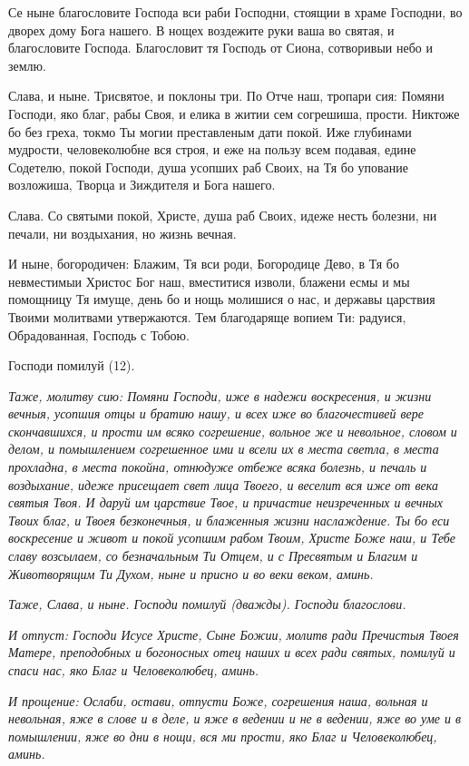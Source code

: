 Се ныне благословите Господа вси раби Господни, стоящии в храме Господни, во дворех дому Бога нашего. В нощех воздежите руки ваша во святая, и благословите Господа. Благословит тя Господь от Сиона, сотворивыи небо и землю.


Слава, и ныне. Трисвятое, и поклоны три. По Отче наш, тропари сия: Помяни Господи, яко благ, рабы Своя, и елика в житии сем согрешиша, прости. Никтоже бо без греха, токмо Ты могии преставленым дати покой. Иже глубинами мудрости, человеколюбне вся строя, и еже на пользу всем подавая, едине Содетелю, покой Господи, душа усопших раб Своих, на Тя бо упование возложиша, Творца и Зиждителя и Бога нашего.


Слава. Со святыми покой, Христе, душа раб Своих, идеже несть болезни, ни печали, ни воздыхания, но жизнь вечная.


И ныне, богородичен: Блажим, Тя вси роди, Богородице Дево, в Тя бо невместимыи Христос Бог наш, вместитися изволи, блажени есмы и мы помощницу Тя имуще, день бо и нощь молишися о нас, и державы царствия Твоими молитвами утвержаются. Тем благодаряще вопием Ти: радуися, Обрадованная, Господь с Тобою.


Господи помилуй (12).


\itshape Таже, молитву сию:\normalfont{} Помяни Господи, иже в надежи воскресения, и жизни вечныя, усопшия отцы и братию нашу, и всех иже во благочестивей вере скончавшихся, и прости им всяко согрешение, вольное же и невольное, словом и делом, и помышлением согрешенное ими и всели их в места светла, в места прохладна, в места покойна, отнюдуже отбеже всяка болезнь, и печаль и воздыхание, идеже присещает свет лица Твоего, и веселит вся иже от века святыя Твоя. И даруй им царствие Твое, и причастие неизреченных и вечных Твоих благ, и Твоея безконечныя, и блаженныя жизни наслаждение. Ты бо еси воскресение и живот и покой усопшим рабом Твоим, Христе Боже наш, и Тебе славу возсылаем, со безначальным Ти Отцем, и с Пресвятым и Благим и Животворящим Ти Духом, ныне и присно и во веки веком, аминь.


\itshape Таже, Слава, и ныне. Господи помилуй (дважды). Господи благослови.\normalfont{}


\itshape И отпуст:\normalfont{} Господи Исусе Христе, Сыне Божии, молитв ради Пречистыя Твоея Матере, преподобных и богоносных отец наших и всех ради святых, помилуй и спаси нас, яко Благ и Человеколюбец, аминь.


\itshape И прощение:\normalfont{} Ослаби, остави, отпусти Боже, согрешения наша, вольная и невольная, яже в слове и в деле, и яже в ведении и не в ведении, яже во уме и в помышлении, яже во дни в нощи, вся ми прости, яко Благ и Человеколюбец, аминь.


